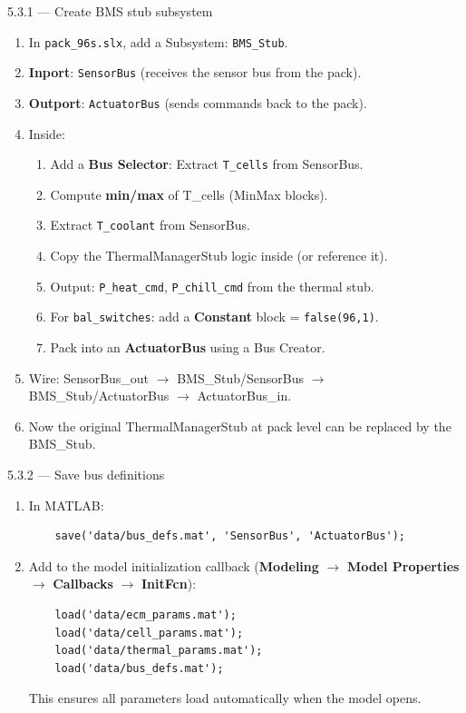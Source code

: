 \documentclass[11pt,a4paper]{article}
\begin{document}
\begin{guistep}{5.3.1 — Create BMS stub subsystem}
\begin{enumerate}
    \item In \texttt{pack\_96s.slx}, add a Subsystem: \texttt{BMS\_Stub}.
    \item \textbf{Inport}: \texttt{SensorBus} (receives the sensor bus from the pack).
    \item \textbf{Outport}: \texttt{ActuatorBus} (sends commands back to the pack).
    \item Inside:
    \begin{enumerate}[label=\alph*)]
        \item Add a \textbf{Bus Selector}: Extract \texttt{T\_cells} from SensorBus.
        \item Compute \textbf{min/max} of T\_cells (MinMax blocks).
        \item Extract \texttt{T\_coolant} from SensorBus.
        \item Copy the ThermalManagerStub logic inside (or reference it).
        \item Output: \texttt{P\_heat\_cmd}, \texttt{P\_chill\_cmd} from the thermal stub.
        \item For \texttt{bal\_switches}: add a \textbf{Constant} block = \texttt{false(96,1)}.
        \item Pack into an \textbf{ActuatorBus} using a Bus Creator.
    \end{enumerate}
    \item Wire: SensorBus\_out $\to$ BMS\_Stub/SensorBus $\to$ BMS\_Stub/ActuatorBus $\to$ ActuatorBus\_in.
    \item Now the original ThermalManagerStub at pack level can be replaced by the BMS\_Stub.
\end{enumerate}
\end{guistep}

\begin{guistep}{5.3.2 — Save bus definitions}
\begin{enumerate}
    \item In MATLAB:
    \begin{verbatim}
    save('data/bus_defs.mat', 'SensorBus', 'ActuatorBus');
    \end{verbatim}
    \item Add to the model initialization callback (\textbf{Modeling} $\to$ \textbf{Model Properties} $\to$ \textbf{Callbacks} $\to$ \textbf{InitFcn}):
    \begin{verbatim}
    load('data/ecm_params.mat');
    load('data/cell_params.mat');
    load('data/thermal_params.mat');
    load('data/bus_defs.mat');
    \end{verbatim}
    This ensures all parameters load automatically when the model opens.
\end{enumerate}
\end{guistep}
\end{document}

